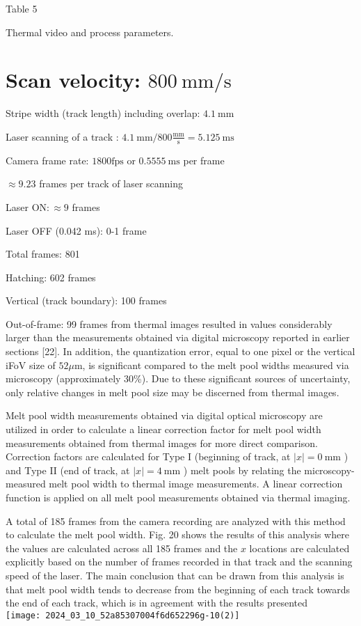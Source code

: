 \documentclass[10pt]{article}
\begin{document}
Table 5

Thermal video and process parameters.

\section*{Scan velocity: $800 \mathrm{~mm} / \mathrm{s}$}
Stripe width (track length) including overlap: $4.1 \mathrm{~mm}$

Laser scanning of a track : $4.1 \mathrm{~mm} / 800 \frac{\mathrm{mm}}{\mathrm{s}}=5.125 \mathrm{~ms}$

Camera frame rate: $1800 \mathrm{fps}$ or $0.5555 \mathrm{~ms}$ per frame

$\approx 9.23$ frames per track of laser scanning

Laser $\mathrm{ON}: \approx 9$ frames

Laser OFF (0.042 ms): 0-1 frame

Total frames: 801

Hatching: 602 frames

Vertical (track boundary): 100 frames

Out-of-frame: 99 frames from thermal images resulted in values considerably larger than the measurements obtained via digital microscopy reported in earlier sections [22]. In addition, the quantization error, equal to one pixel or the vertical iFoV size of $52 \mu \mathrm{m}$, is significant compared to the melt pool widths measured via microscopy (approximately 30\%). Due to these significant sources of uncertainty, only relative changes in melt pool size may be discerned from thermal images.

Melt pool width measurements obtained via digital optical microscopy are utilized in order to calculate a linear correction factor for melt pool width measurements obtained from thermal images for more direct comparison. Correction factors are calculated for Type I (beginning of track, at $|x|=0 \mathrm{~mm}$ ) and Type II (end of track, at $|x|=4 \mathrm{~mm}$ ) melt pools by relating the microscopy-measured melt pool width to thermal image measurements. A linear correction function is applied on all melt pool measurements obtained via thermal imaging.

A total of 185 frames from the camera recording are analyzed with this method to calculate the melt pool width. Fig. 20 shows the results of this analysis where the values are calculated across all 185 frames and the $x$ locations are calculated explicitly based on the number of frames recorded in that track and the scanning speed of the laser. The main conclusion that can be drawn from this analysis is that melt pool width tends to decrease from the beginning of each track towards the end of each track, which is in agreement with the results presented\\
\texttt{[image: 2024\_03\_10\_52a85307004f6d652296g-10(2)]}
\end{document}
